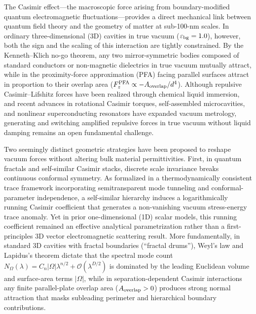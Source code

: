 \documentclass[pdflatex,sn-nature]{sn-jnl}
\begin{document}
\maketitle

The Casimir effect---the macroscopic force arising from boundary-modified quantum electromagnetic fluctuations\cite{casimir1948,bordag2009}---provides a direct mechanical link between quantum field theory and the geometry of matter at sub-100-nm scales. In ordinary three-dimensional (3D) cavities in true vacuum ($\varepsilon_{\rm bg}=1.0$), however, both the sign and the scaling of this interaction are tightly constrained. By the Kenneth--Klich no-go theorem\cite{kennethklich2006}, any two mirror-symmetric bodies composed of standard conductors or non-magnetic dielectrics in true vacuum mutually attract, while in the proximity-force approximation (PFA) facing parallel surfaces attract in proportion to their overlap area ($F_z^{\rm PFA} \propto -A_{\rm overlap}/d^4$). Although repulsive Casimir--Lifshitz forces have been realized through chemical liquid immersion\cite{munday2009}, and recent advances in rotational Casimir torques\cite{somers2018}, self-assembled microcavities\cite{munkhbat2021}, and nonlinear superconducting resonators\cite{casimir_drum2025,dejong2026} have expanded vacuum metrology, generating and switching amplified repulsive forces in true vacuum without liquid damping remains an open fundamental challenge\cite{rodriguez2011}.

Two seemingly distinct geometric strategies have been proposed to reshape vacuum forces without altering bulk material permittivities. First, in quantum fractals\cite{kempkes2019,xu2021} and self-similar Casimir stacks\cite{akkermans2010,shajesh2016,shajesh2017}, discrete scale invariance breaks continuous conformal symmetry. As formalized in a thermodynamically consistent trace framework incorporating semitransparent mode tunneling and conformal-parameter independence\cite{milton2004,milton2016,gordon2026prd}, a self-similar hierarchy induces a logarithmically running Casimir coefficient that generates a non-vanishing vacuum stress-energy trace anomaly. Yet in prior one-dimensional (1D) scalar models\cite{gordon2026prd}, this running coefficient remained an effective analytical parametrization rather than a first-principles 3D vector electromagnetic scattering result. More fundamentally, in standard 3D cavities with fractal boundaries (``fractal drums''), Weyl's law and Lapidus's theorem\cite{lapidus1991} dictate that the spectral mode count $N_\Omega(\lambda) = C_n |\Omega|\lambda^{n/2} + \mathcal{O}(\lambda^{D/2})$ is dominated by the leading Euclidean volume and surface-area terms $|\Omega|$, while in separation-dependent Casimir interactions any finite parallel-plate overlap area ($A_{\rm overlap} > 0$) produces strong normal attraction that masks subleading perimeter and hierarchical boundary contributions.
\end{document}
